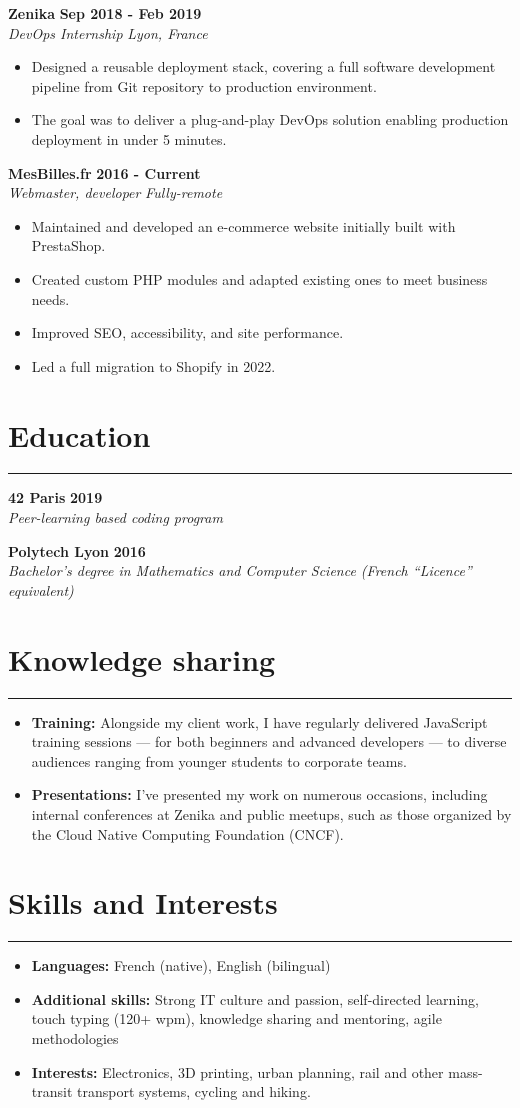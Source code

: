 \documentclass[11pt]{article}
\newcommand{\experience}[4]{%
  \vspace{5pt}
  \textbf{#2} \hfill \textbf{#3} \\
  \textit{#1} \hfill \textit{#4} \\
  \vspace{-10pt}
}
\newcommand{\cvsection}[1]{%
  \section*{#1}
    \vspace{-10pt}
    \hrule
    \vspace{10pt}
}
\begin{document}
\experience{DevOps Internship}{Zenika}{Sep 2018 - Feb 2019}{Lyon, France}
\vspace{-10pt}
\begin{itemize}
  \item Designed a reusable deployment stack, covering a full software development pipeline from Git repository to production environment.
  \item The goal was to deliver a plug-and-play DevOps solution enabling production deployment in under 5 minutes.
\end{itemize}

\experience{Webmaster, developer}{MesBilles.fr}{2016 - Current}{Fully-remote}
\vspace{-10pt}
\begin{itemize}
    \item Maintained and developed an e-commerce website initially built with PrestaShop.
    \item Created custom PHP modules and adapted existing ones to meet business needs.
    \item Improved SEO, accessibility, and site performance.
    \item Led a full migration to Shopify in 2022.
\end{itemize}

\cvsection{Education}

\experience{Peer-learning based coding program}{42 Paris}{2019}{}

\experience{Bachelor's degree in Mathematics and Computer Science (French \enquote{Licence} equivalent)}{Polytech Lyon}{2016}{}

\cvsection{Knowledge sharing}

\begin{itemize}
    \item \textbf{Training:} Alongside my client work, I have regularly delivered JavaScript training sessions — for both beginners and advanced developers — to diverse audiences ranging from younger students to corporate teams.
    \item \textbf{Presentations:} I've presented my work on numerous occasions, including internal conferences at Zenika and public meetups, such as those organized by the Cloud Native Computing Foundation (CNCF).
\end{itemize}



\cvsection{Skills and Interests}

\begin{itemize}
  \item \textbf{Languages:} French (native), English (bilingual)
  \item \textbf{Additional skills:} Strong IT culture and passion, self-directed learning, touch typing (120+ wpm), knowledge sharing and mentoring, agile methodologies
  \item \textbf{Interests:} Electronics, 3D printing, urban planning, rail and other mass-transit transport systems, cycling and hiking.
\end{itemize}
\end{document}

